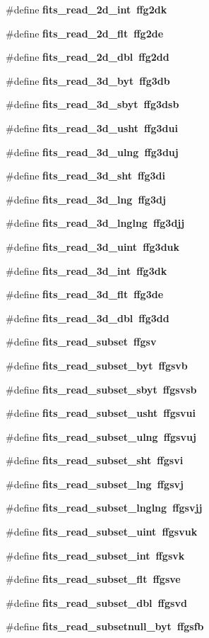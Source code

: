 \begin{CompactItemize}
\#define \bf{fits\_\-read\_\-2d\_\-int}~ffg2dk
\item 
\#define \bf{fits\_\-read\_\-2d\_\-flt}~ffg2de
\item 
\#define \bf{fits\_\-read\_\-2d\_\-dbl}~ffg2dd
\item 
\#define \bf{fits\_\-read\_\-3d\_\-byt}~ffg3db
\item 
\#define \bf{fits\_\-read\_\-3d\_\-sbyt}~ffg3dsb
\item 
\#define \bf{fits\_\-read\_\-3d\_\-usht}~ffg3dui
\item 
\#define \bf{fits\_\-read\_\-3d\_\-ulng}~ffg3duj
\item 
\#define \bf{fits\_\-read\_\-3d\_\-sht}~ffg3di
\item 
\#define \bf{fits\_\-read\_\-3d\_\-lng}~ffg3dj
\item 
\#define \bf{fits\_\-read\_\-3d\_\-lnglng}~ffg3djj
\item 
\#define \bf{fits\_\-read\_\-3d\_\-uint}~ffg3duk
\item 
\#define \bf{fits\_\-read\_\-3d\_\-int}~ffg3dk
\item 
\#define \bf{fits\_\-read\_\-3d\_\-flt}~ffg3de
\item 
\#define \bf{fits\_\-read\_\-3d\_\-dbl}~ffg3dd
\item 
\#define \bf{fits\_\-read\_\-subset}~ffgsv
\item 
\#define \bf{fits\_\-read\_\-subset\_\-byt}~ffgsvb
\item 
\#define \bf{fits\_\-read\_\-subset\_\-sbyt}~ffgsvsb
\item 
\#define \bf{fits\_\-read\_\-subset\_\-usht}~ffgsvui
\item 
\#define \bf{fits\_\-read\_\-subset\_\-ulng}~ffgsvuj
\item 
\#define \bf{fits\_\-read\_\-subset\_\-sht}~ffgsvi
\item 
\#define \bf{fits\_\-read\_\-subset\_\-lng}~ffgsvj
\item 
\#define \bf{fits\_\-read\_\-subset\_\-lnglng}~ffgsvjj
\item 
\#define \bf{fits\_\-read\_\-subset\_\-uint}~ffgsvuk
\item 
\#define \bf{fits\_\-read\_\-subset\_\-int}~ffgsvk
\item 
\#define \bf{fits\_\-read\_\-subset\_\-flt}~ffgsve
\item 
\#define \bf{fits\_\-read\_\-subset\_\-dbl}~ffgsvd
\item 
\#define \bf{fits\_\-read\_\-subsetnull\_\-byt}~ffgsfb
\item 

\end{CompactItemize}

